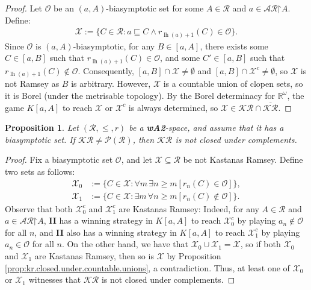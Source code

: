 \documentclass[11pt,reqno]{amsart}
\theoremstyle{plain}
\numberwithin{equation}{section}
\newtheorem{proposition}[theorem]{Proposition}
\theoremstyle{definition}
\newcommand{\func}{\operatorname}
\newcommand{\R}{\mathbb{R}}
\newcommand{\Po}{\cal{P}}
\renewcommand{\bar}[1]{\overline{#1}}
\newcommand{\cal}{\mathcal}
\newcommand{\bcal}[1]{\bm{\mathcal{#1}}}
\newcommand{\restrictedto}{\mathord{\upharpoonright}}
\newcommand{\X}{\cal{X}}
\newcommand{\lh}{\func{lh}}
\renewcommand{\O}{\cal{O}}
\begin{document}
\begin{proof}
    Let $\O$ be an $(a,A)$-biasymptotic set for some $A \in \cal{R}$ and $a \in \cal{AR}\restrictedto A$. Define:
    \begin{align*}
        \X := \{C \in \cal{R} : a \sqsubseteq C \wedge r_{\lh(a)+1}(C) \in \O\}.
    \end{align*}
    Since $\O$ is $(a,A)$-biasymptotic, for any $B \in [a,A]$, there exists some $C \in [a,B]$ such that $r_{\lh(a)+1}(C) \in \O$, and some $C' \in [a,B]$ such that $r_{\lh(a)+1}(C) \notin \O$. Consequently, $[a,B] \cap \X \neq \emptyset$ and $[a,B] \cap \X^c \neq \emptyset$, so $\X$ is not Ramsey as $B$ is arbitrary. However, $\X$ is a countable union of clopen sets, so it is Borel (under the metrisable topology). By the Borel determinacy for $\R^\omega$, the game $K[a,A]$ to reach $\X$ or $\X^c$ is always determined, so $\X \in \bcal{KR} \cap \bar{\bcal{KR}}$.
\end{proof}

\begin{proposition}
\label{prop:kr.not.symmetric}
    Let $(\cal{R},\leq,r)$ be a \textbf{wA2}-space, and assume that it has a biasymptotic set. If $\bcal{KR} \neq \Po(\cal{R})$, then $\bcal{KR}$ is not closed under complements.
\end{proposition}

\begin{proof}
    Fix a biasymptotic set $\O$, and let $\X \subseteq \cal{R}$ be not Kastanas Ramsey. Define two sets as follows:
    \begin{align*}
        \X_0 &:= \{C \in \X : \forall m \, \exists n \geq m[r_n(C) \in \O]\}, \\
        \X_1 &:= \{C \in \X : \exists m \, \forall n \geq m[r_n(C) \notin \O]\}.
    \end{align*}
    Observe that both $\X_0^c$ and $\X_1^c$ are Kastanas Ramsey: Indeed, for any $A \in \cal{R}$ and $a \in \cal{AR}\restrictedto A$, \textbf{II} has a winning strategy in $K[a,A]$ to reach $\X_0^c$ by playing $a_n \notin \O$ for all $n$, and \textbf{II} also has a winning strategy in $K[a,A]$ to reach $\X_1^c$ by playing $a_n \in \O$ for all $n$. On the other hand, we have that $\X_0 \cup \X_1 = \X$, so if both $\X_0$ and $\X_1$ are Kastanas Ramsey, then so is $\X$ by Proposition \ref{prop:kr.closed.under.countable.unions}, a contradiction. Thus, at least one of $\X_0$ or $\X_1$ witnesses that $\bcal{KR}$ is not closed under complements.
\end{proof}
\end{document}

